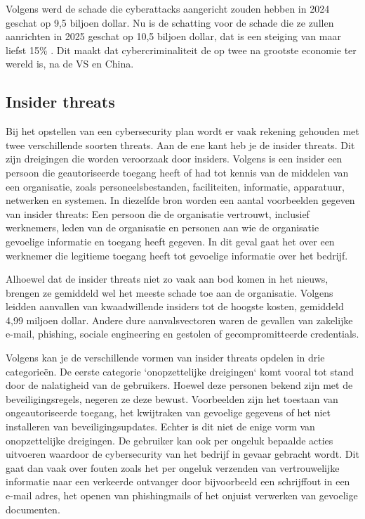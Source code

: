 Volgens \textcite{Morgan2024} werd de schade die cyberattacks aangericht zouden hebben in 2024 geschat op 9,5 biljoen dollar. Nu is de schatting voor de schade die ze zullen aanrichten in 2025 geschat op 10,5 biljoen dollar, dat is een steiging van maar liefst 15\% . Dit maakt dat cybercriminaliteit de op twee na grootste economie ter wereld is, na de VS en China.

\subsection{Insider threats}
Bij het opstellen van een cybersecurity plan wordt er vaak rekening gehouden met twee verschillende soorten threats. Aan de ene kant heb je de insider threats. Dit zijn dreigingen die worden veroorzaak door insiders. Volgens \textcite{Cisa2025} is een insider een persoon die geautoriseerde toegang heeft of had tot kennis van de middelen van een organisatie, zoals personeelsbestanden, faciliteiten, informatie, apparatuur, netwerken en systemen. In diezelfde bron worden een aantal voorbeelden gegeven van insider threats: Een persoon die de organisatie vertrouwt, inclusief werknemers, leden van de organisatie en personen aan wie de organisatie gevoelige informatie en toegang heeft gegeven. In dit geval gaat het over een werknemer die legitieme toegang heeft tot gevoelige informatie over het bedrijf.

\vspace{5mm}
Alhoewel dat de insider threats niet zo vaak aan bod komen in het nieuws, brengen ze gemiddeld wel het meeste schade toe aan de organisatie. Volgens \textcite{ibm2024} leidden aanvallen van kwaadwillende insiders tot de hoogste kosten, gemiddeld 4,99 miljoen dollar. Andere dure aanvalsvectoren waren de gevallen van zakelijke e-mail, phishing, sociale engineering en gestolen of gecompromitteerde credentials. 

\vspace{5mm}
Volgens \textcite{Cisa2025} kan je de verschillende vormen van insider threats opdelen in drie categorieën. De eerste categorie `onopzettelijke dreigingen` komt vooral tot stand door de nalatigheid van de gebruikers.  Hoewel deze personen bekend zijn met de beveiligingsregels, negeren ze deze bewust. Voorbeelden zijn het toestaan van ongeautoriseerde toegang, het kwijtraken van gevoelige gegevens of het niet installeren van beveiligingsupdates. Echter is dit niet de enige vorm van onopzettelijke dreigingen. De gebruiker kan ook per ongeluk bepaalde acties uitvoeren waardoor de cybersecurity van het bedrijf in gevaar gebracht wordt. Dit gaat dan vaak over fouten zoals het per ongeluk verzenden van vertrouwelijke informatie naar een verkeerde ontvanger door bijvoorbeeld een schrijffout in een e-mail adres, het openen van phishingmails of het onjuist verwerken van gevoelige documenten.

